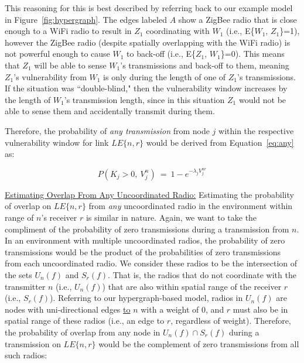 
This reasoning for this is best described by referring back to our example model in Figure~\ref{fig:hypergraph}.  The edges labeled $A$ show a ZigBee radio that is close enough to a WiFi radio to result in $Z_1$ coordinating with $W_1$ (i.e., E\{$W_1$, $Z_1$\}=1), however the ZigBee radio (despite spatially overlapping with the WiFi radio) is not powerful enough to cause $W_1$ to back-off (i.e., E\{$Z_1$, $W_1$\}=0).  This means that $Z_1$ will be able to sense $W_1$'s transmissions and back-off to them, meaning $Z_1$'s vulnerability from $W_1$ is only during the length of one of $Z_1$'s transmissions.  If the situation was ``double-blind," then the vulnerability window increases by the length of $W_1$'s transmission length, since in this situation $Z_1$ would not be able to sense them and accidentally transmit during them. 

Therefore, the probability of \emph{any transmission} from node $j$ within the respective vulnerability window for link $LE\{n,r\}$ would be derived from Equation~\ref{eq:any} as:

\vspace{-0.15in}
\begin{equation}
\label{eq:overlap_single}
P(K_j>0,~V^n_j)~=~1-e^{- \lambda_j V^{nr}_j}
\end{equation}

\vspace{0.1in}
\noindent \uline{Estimating Overlap From Any Uncoordinated Radio:}  Estimating the probability of overlap on $LE\{n,r\}$ from \emph{any} uncoordinated radio in the environment within range of $n$'s receiver $r$ is similar in nature.  Again, we want to take the compliment of the probability of zero transmissions during a transmission from $n$.  In an environment with multiple uncoordinated radios, the probability of zero transmissions would be the product of the probabilities of zero transmissions from each uncoordinated radio.  We consider these radios to be the intersection of the sets $U_n(f)$ and $S_r(f)$.  That is, the radios that do not coordinate with the transmitter $n$ (i.e., $U_n(f)$) that are also within spatial range of the receiver $r$ (i.e., $S_r(f)$).  Referring to our hypergraph-based model, radios in $U_n(f)$ are nodes with uni-directional edges \uline{to} $n$ with a weight of 0, and $r$ must also be in spatial range of these radios (i.e., an edge to $r$, regardless of weight).  Therefore, the probability of overlap from any node in $U_n(f) \cap S_r(f)$ during a transmission on $LE\{n,r\}$ would be the complement of zero transmissions from all such radios:

